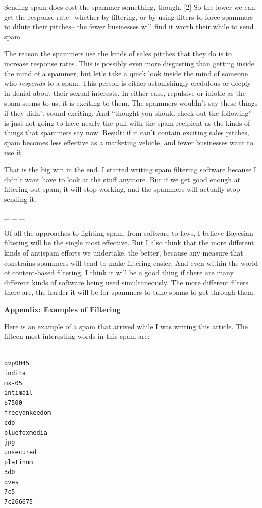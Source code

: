 Sending spam does cost the spammer something, though. {[}2{]} So the
lower we can get the response rate-- whether by filtering, or by using
filters to force spammers to dilute their pitches-- the fewer businesses
will find it worth their while to send spam.

The reason the spammers use the kinds of
\href{http://www.milliondollaremails.com}{sales pitches} that they do is
to increase response rates. This is possibly even more disgusting than
getting inside the mind of a spammer, but let's take a quick look inside
the mind of someone who \emph{responds} to a spam. This person is either
astonishingly credulous or deeply in denial about their sexual
interests. In either case, repulsive or idiotic as the spam seems to us,
it is exciting to them. The spammers wouldn't say these things if they
didn't sound exciting. And ``thought you should check out the
following'' is just not going to have nearly the pull with the spam
recipient as the kinds of things that spammers say now. Result: if it
can't contain exciting sales pitches, spam becomes less effective as a
marketing vehicle, and fewer businesses want to use it.

That is the big win in the end. I started writing spam filtering
software because I didn't want have to look at the stuff anymore. But if
we get good enough at filtering out spam, it will stop working, and the
spammers will actually stop sending it.

\_ \_ \_

Of all the approaches to fighting spam, from software to laws, I believe
Bayesian filtering will be the single most effective. But I also think
that the more different kinds of antispam efforts we undertake, the
better, because any measure that constrains spammers will tend to make
filtering easier. And even within the world of content-based filtering,
I think it will be a good thing if there are many different kinds of
software being used simultaneously. The more different filters there
are, the harder it will be for spammers to tune spams to get through
them.

\textbf{Appendix: Examples of Filtering}

\href{https://sep.turbifycdn.com/ty/cdn/paulgraham/spam1.txt?t=1688221954&}{Here}
is an example of a spam that arrived while I was writing this article.
The fifteen most interesting words in this spam are:

\begin{verbatim}

qvp0045
indira
mx-05
intimail
$7500
freeyankeedom
cdo
bluefoxmedia
jpg
unsecured
platinum
3d0
qves
7c5
7c266675
\end{verbatim}

